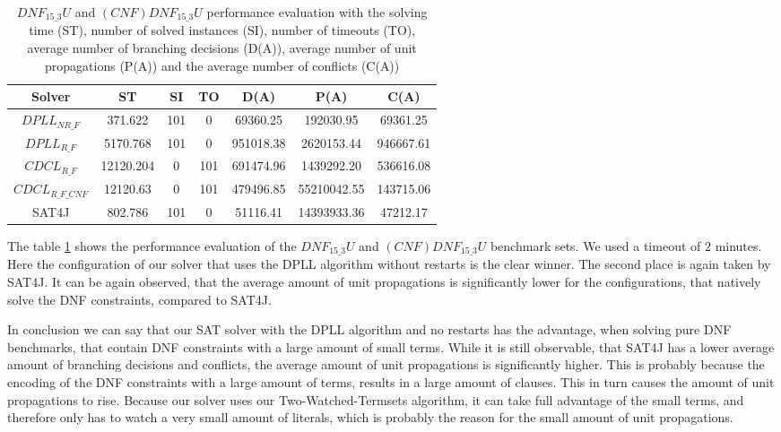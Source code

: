 \begin{table}[!htb]
\centering
\caption[$DNF_{15\_3}U$ and $(CNF)DNF_{15\_3}U$ performance evaluation]{$DNF_{15\_3}U$ and $(CNF)DNF_{15\_3}U$ performance evaluation with the solving time (ST), number of solved instances (SI), number of timeouts (TO), average number of branching decisions (D(A)), average number of unit propagations (P(A)) and the average number of conflicts (C(A))}
\label{tab:dnf153Unsat}
\begin{tabular}{|c|c|c|c|c|c|c|}
\hline
Solver & ST & SI & TO & D(A) & P(A) & C(A)\\ 
\hline
$DPLL_{NR\_F}$ & 371.622 & 101 & 0 & 69360.25 & 192030.95 & 69361.25 \\ 
\hline
$DPLL_{R\_F}$ & 5170.768 & 101 & 0 & 951018.38 & 2620153.44 & 946667.61 \\ 
\hline
$CDCL_{R\_F}$ & 12120.204 & 0 & 101 & 691474.96 & 1439292.20 & 536616.08 \\ 
\hline
$CDCL_{R\_F\_CNF}$ & 12120.63 & 0 & 101 & 479496.85 & 55210042.55 & 143715.06 \\ 
\hline
SAT4J & 802.786 & 101 & 0 & 51116.41 & 14393933.36 & 47212.17 \\ 
\hline
\end{tabular}
\end{table}

The table \ref{tab:dnf153Unsat} shows the performance evaluation of the $DNF_{15\_3}U$ and $(CNF)DNF_{15\_3}U$ benchmark sets. We used a timeout of 2 minutes. Here the configuration of our solver that uses the DPLL algorithm without restarts is the clear winner. The second place is again taken by SAT4J. It can be again observed, that the average amount of unit propagations is significantly lower for the configurations, that natively solve the DNF constraints, compared to SAT4J.

In conclusion we can say that our SAT solver with the DPLL algorithm and no restarts has the advantage, when solving pure DNF benchmarks, that contain DNF constraints with a large amount of small terms. While it is still observable, that SAT4J has a lower average amount of branching decisions and conflicts, the average amount of unit propagations is significantly higher. This is probably because the encoding of the DNF constraints with a large amount of terms, results in a large amount of clauses. This in turn causes the amount of unit propagations to rise. Because our solver uses our Two-Watched-Termsets algorithm, it can take full advantage of the small terms, and therefore only has to watch a very small amount of literals, which is probably the reason for the small amount of unit propagations.

